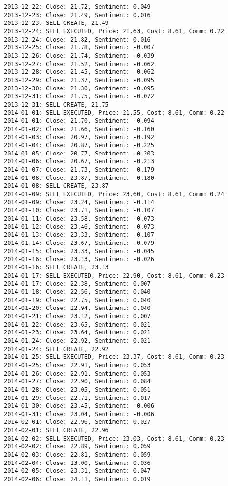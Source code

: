 \documentclass[11pt]{article}
\begin{document}
\begin{Verbatim}[commandchars=\\\{\}]
2013-12-22: Close: 21.72, Sentiment: 0.049
2013-12-23: Close: 21.49, Sentiment: 0.016
2013-12-23: SELL CREATE, 21.49
2013-12-24: SELL EXECUTED, Price: 21.63, Cost: 8.61, Comm: 0.22
2013-12-24: Close: 21.82, Sentiment: 0.016
2013-12-25: Close: 21.78, Sentiment: -0.007
2013-12-26: Close: 21.74, Sentiment: -0.039
2013-12-27: Close: 21.52, Sentiment: -0.062
2013-12-28: Close: 21.45, Sentiment: -0.062
2013-12-29: Close: 21.37, Sentiment: -0.095
2013-12-30: Close: 21.30, Sentiment: -0.095
2013-12-31: Close: 21.75, Sentiment: -0.072
2013-12-31: SELL CREATE, 21.75
2014-01-01: SELL EXECUTED, Price: 21.55, Cost: 8.61, Comm: 0.22
2014-01-01: Close: 21.70, Sentiment: -0.094
2014-01-02: Close: 21.66, Sentiment: -0.160
2014-01-03: Close: 20.97, Sentiment: -0.192
2014-01-04: Close: 20.87, Sentiment: -0.225
2014-01-05: Close: 20.77, Sentiment: -0.203
2014-01-06: Close: 20.67, Sentiment: -0.213
2014-01-07: Close: 21.73, Sentiment: -0.179
2014-01-08: Close: 23.87, Sentiment: -0.180
2014-01-08: SELL CREATE, 23.87
2014-01-09: SELL EXECUTED, Price: 23.60, Cost: 8.61, Comm: 0.24
2014-01-09: Close: 23.24, Sentiment: -0.114
2014-01-10: Close: 23.71, Sentiment: -0.107
2014-01-11: Close: 23.58, Sentiment: -0.073
2014-01-12: Close: 23.46, Sentiment: -0.073
2014-01-13: Close: 23.33, Sentiment: -0.107
2014-01-14: Close: 23.67, Sentiment: -0.079
2014-01-15: Close: 23.33, Sentiment: -0.045
2014-01-16: Close: 23.13, Sentiment: -0.026
2014-01-16: SELL CREATE, 23.13
2014-01-17: SELL EXECUTED, Price: 22.90, Cost: 8.61, Comm: 0.23
2014-01-17: Close: 22.38, Sentiment: 0.007
2014-01-18: Close: 22.56, Sentiment: 0.040
2014-01-19: Close: 22.75, Sentiment: 0.040
2014-01-20: Close: 22.94, Sentiment: 0.040
2014-01-21: Close: 23.12, Sentiment: 0.007
2014-01-22: Close: 23.65, Sentiment: 0.021
2014-01-23: Close: 23.64, Sentiment: 0.021
2014-01-24: Close: 22.92, Sentiment: 0.021
2014-01-24: SELL CREATE, 22.92
2014-01-25: SELL EXECUTED, Price: 23.37, Cost: 8.61, Comm: 0.23
2014-01-25: Close: 22.91, Sentiment: 0.053
2014-01-26: Close: 22.91, Sentiment: 0.053
2014-01-27: Close: 22.90, Sentiment: 0.084
2014-01-28: Close: 23.05, Sentiment: 0.051
2014-01-29: Close: 22.71, Sentiment: 0.017
2014-01-30: Close: 23.45, Sentiment: -0.006
2014-01-31: Close: 23.04, Sentiment: -0.006
2014-02-01: Close: 22.96, Sentiment: 0.027
2014-02-01: SELL CREATE, 22.96
2014-02-02: SELL EXECUTED, Price: 23.03, Cost: 8.61, Comm: 0.23
2014-02-02: Close: 22.89, Sentiment: 0.059
2014-02-03: Close: 22.81, Sentiment: 0.059
2014-02-04: Close: 23.00, Sentiment: 0.036
2014-02-05: Close: 23.31, Sentiment: 0.047
2014-02-06: Close: 24.11, Sentiment: 0.019

\end{Verbatim}
\end{document}
